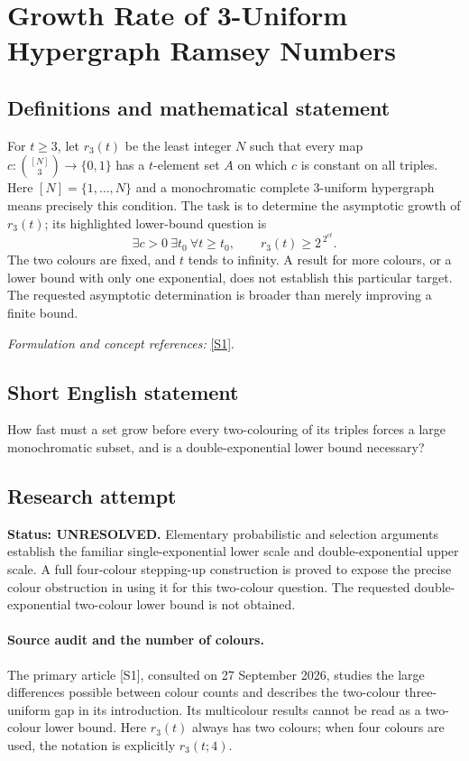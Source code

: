 \documentclass[11pt]{article}
\begin{document}
\section*{\texorpdfstring{Growth Rate of 3-Uniform Hypergraph Ramsey Numbers}{Growth Rate of 3-Uniform Hypergraph Ramsey Numbers}}\label{statement}
\subsection{Definitions and mathematical statement}
For $t\ge3$, let $r_3(t)$ be the least integer $N$ such that every map $c:\binom{[N]}3\to\{0,1\}$ has a $t$-element set $A$ on which $c$ is constant on all triples. Here $[N]=\{1,\ldots,N\}$ and a monochromatic complete $3$-uniform hypergraph means precisely this condition. The task is to determine the asymptotic growth of $r_3(t)$; its highlighted lower-bound question is
\[
 \exists c>0\ \exists t_0\ \forall t\ge t_0,
 \qquad r_3(t)\ge 2^{\,2^{ct}}.
\]
The two colours are fixed, and $t$ tends to infinity. A result for more colours, or a lower bound with only one exponential, does not establish this particular target. The requested asymptotic determination is broader than merely improving a finite bound.
\par\smallskip\textit{Formulation and concept references:} \href{https://www.cambridge.org/core/journals/forum-of-mathematics-sigma/article/tower-gaps-in-multicolour-ramsey-numbers/B688491701E6FCC40E202C9B7B3AB672}{[S1]}.

\subsection{Short English statement}
How fast must a set grow before every two-colouring of its triples forces a large monochromatic subset, and is a double-exponential lower bound necessary?
\subsection{Research attempt}
\textbf{Status: UNRESOLVED.} Elementary probabilistic and selection arguments establish the familiar single-exponential lower scale and double-exponential upper scale. A full four-colour stepping-up construction is proved to expose the precise colour obstruction in using it for this two-colour question. The requested double-exponential two-colour lower bound is not obtained.

\paragraph{Source audit and the number of colours.}
The primary article [S1], consulted on 27 September 2026, studies the large differences possible between colour counts and describes the two-colour three-uniform gap in its introduction. Its multicolour results cannot be read as a two-colour lower bound. Here $r_3(t)$ always has two colours; when four colours are used, the notation is explicitly $r_3(t;4)$.
\end{document}

